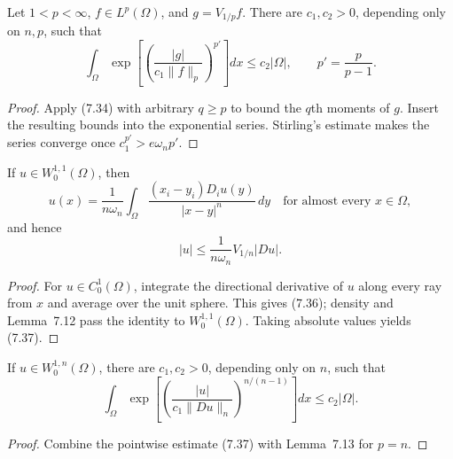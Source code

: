 \begin{lemma}
\label{gt:lem-sobolev-riemann-potential-exponential}
Let $1<p<\infty$, $f\in L^p(\Omega)$, and $g=V_{1/p}f$. There are
$c_1,c_2>0$, depending only on $n,p$, such that
\begin{equation}
\tag{7.35}
\int_\Omega
\exp\!\left[\left(\frac{|g|}{c_1\|f\|_p}\right)^{p'}\right]dx
\leq c_2|\Omega|,
\qquad p'=\frac p{p-1}.
\end{equation}
\end{lemma}
\begin{proof}
\sketch Apply (7.34) with arbitrary $q\geq p$ to bound the $q$th moments
of $g$. Insert the resulting bounds into the exponential series. Stirling's
estimate makes the series converge once $c_1^{p'}>e\omega_np'$.
\end{proof}

\begin{lemma}
\label{gt:lem-sobolev-newtonian-representation}
If $u\in W_0^{1,1}(\Omega)$, then
\begin{equation}
\tag{7.36}
u(x)=\frac1{n\omega_n}\int_\Omega
\frac{(x_i-y_i)D_i u(y)}{|x-y|^n}\,dy
\quad\text{for almost every }x\in\Omega,
\end{equation}
and hence
\begin{equation}
\tag{7.37}
|u|\leq\frac1{n\omega_n}V_{1/n}|Du|.
\end{equation}
\end{lemma}
\begin{proof}
\sketch For $u\in C_0^1(\Omega)$, integrate the directional derivative of
$u$ along every ray from $x$ and average over the unit sphere. This gives
(7.36); density and Lemma~7.12 pass the identity to $W_0^{1,1}(\Omega)$.
Taking absolute values yields (7.37).
\end{proof}

\begin{theorem}
\label{gt:thm-sobolev-moser-trudinger}
If $u\in W_0^{1,n}(\Omega)$, there are $c_1,c_2>0$, depending only on $n$,
such that
\begin{equation}
\tag{7.38}
\int_\Omega
\exp\!\left[\left(\frac{|u|}{c_1\|Du\|_n}\right)^{n/(n-1)}\right]dx
\leq c_2|\Omega|.
\end{equation}
\end{theorem}
\begin{proof}
\sketch Combine the pointwise estimate (7.37) with Lemma~7.13 for $p=n$.
\end{proof}

